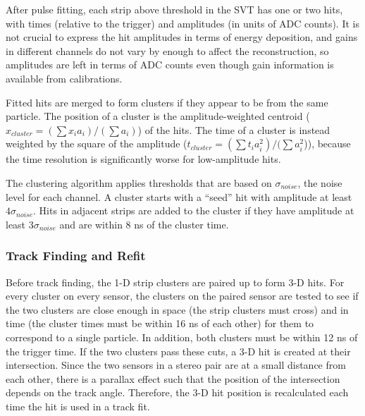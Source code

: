 After pulse fitting, each strip above threshold in the SVT has one or two hits, with times (relative to the trigger) and amplitudes (in units of ADC counts).
It is not crucial to express the hit amplitudes in terms of energy deposition, and gains in different channels do not vary by enough to affect the reconstruction, so amplitudes are left in terms of ADC counts even though gain information is available from calibrations.

Fitted hits are merged to form clusters if they appear to be from the same particle.
The position of a cluster is the amplitude-weighted centroid ($x_{cluster}=(\sum x_i a_i)/(\sum a_i)$) of the hits.
The time of a cluster is instead weighted by the square of the amplitude ($t_{cluster}=(\sum t_i a_i^2)/(\sum a_i^2$)), because the time resolution is significantly worse for low-amplitude hits.

The clustering algorithm applies thresholds that are based on $\sigma_{noise}$, the noise level for each channel.
A cluster starts with a ``seed'' hit with amplitude at least $4\sigma_{noise}$.
Hits in adjacent strips are added to the cluster if they have amplitude at least $3\sigma_{noise}$ and are within 8 ns of the cluster time.

\subsubsection{Track Finding and Refit}
\label{sec:track_finding_refit}
Before track finding, the 1-D strip clusters are paired up to form 3-D hits.
For every cluster on every sensor, the clusters on the paired sensor are tested to see if the two clusters are close enough in space (the strip clusters must cross) and in time (the cluster times must be within 16 ns of each other) for them to correspond to a single particle.
In addition, both clusters must be within 12 ns of the trigger time.
If the two clusters pass these cuts, a 3-D hit is created at their intersection.
Since the two sensors in a stereo pair are at a small distance from each other, there is a parallax effect such that the position of the intersection depends on the track angle.
Therefore, the 3-D hit position is recalculated each time the hit is used in a track fit.

